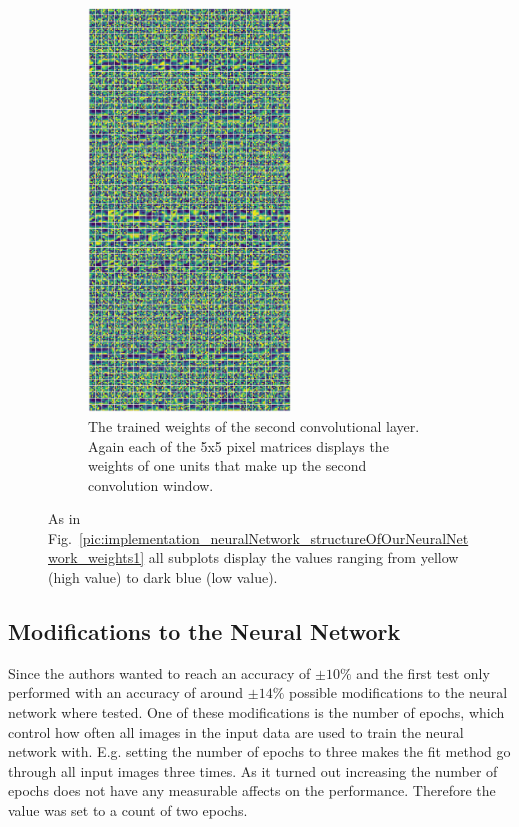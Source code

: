 \newpage

\begin{figure}[h!]
	\centering
	\begin{subfigure}[t]{\textwidth}
		\centering
		\includegraphics[width=0.59\textwidth]{img/implementation_neuralNetwork_structureOfOurNeuralNetwork_conv2D_2.pdf}
		\caption{The trained weights of the second convolutional layer. Again each of the 5x5 pixel matrices displays the weights of one units that make up the second convolution window.}
		\label{pic:implementation_neuralNetwork_structureOfOurNeuralNetwork_weights_b}
	\end{subfigure}
	\caption{As in Fig.~\ref{pic:implementation_neuralNetwork_structureOfOurNeuralNetwork_weights1} all subplots display the values ranging from yellow (high value) to dark blue (low value).}
	\label{pic:implementation_neuralNetwork_structureOfOurNeuralNetwork_weights2}
\end{figure}

\newpage

\subsection{Modifications to the Neural Network}
\label{sec:modificationsToTheNeuralNetwork}
Since the authors wanted to reach an accuracy of $\pm 10\%$ and the first test only performed with an accuracy of around $\pm 14\%$ possible modifications to the neural network where tested. One of these modifications is the number of epochs, which control how often all images in the input data are used to train the neural network with. E.g. setting the number of epochs to three makes the fit method go through all input images three times. As it turned out increasing the number of epochs does not have any measurable affects on the performance. Therefore the value was set to a count of two epochs.

